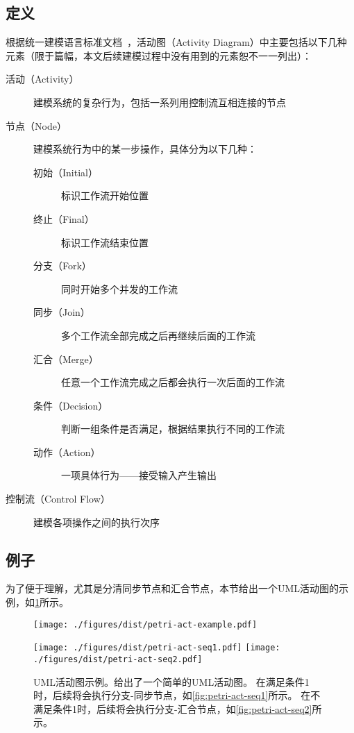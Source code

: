 \documentclass[index]{subfiles}
\begin{document}
\subsection{定义}
根据统一建模语言标准文档~，活动图（Activity Diagram）中主要包括以下几种元素（限于篇幅，本文后续建模过程中没有用到的元素恕不一一列出）：
\begin{description}
  \item[活动（Activity）] 建模系统的复杂行为，包括一系列用控制流互相连接的节点
  \item[节点（Node）] 建模系统行为中的某一步操作，具体分为以下几种：
  \begin{description}
    \item[初始（Initial）] 标识工作流开始位置
    \item[终止（Final）] 标识工作流结束位置
    \item[分支（Fork）] 同时开始多个并发的工作流
    \item[同步（Join）] 多个工作流全部完成之后再继续后面的工作流
    \item[汇合（Merge）] 任意一个工作流完成之后都会执行一次后面的工作流
    \item[条件（Decision）] 判断一组条件是否满足，根据结果执行不同的工作流
    \item[动作（Action）] 一项具体行为——接受输入产生输出
  \end{description}
  \item[控制流（Control Flow）] 建模各项操作之间的执行次序
\end{description}

\subsection{例子}
为了便于理解，尤其是分清同步节点和汇合节点，本节给出一个UML活动图的示例，如\cref{fig:petri-act}所示。
\begin{figure}[h]
  \centering%
    {\texttt{[image: ./figures/dist/petri-act-example.pdf]}}\par
    {\texttt{[image: ./figures/dist/petri-act-seq1.pdf]}}
  \hspace{10em}
    {\texttt{[image: ./figures/dist/petri-act-seq2.pdf]}}
  \caption[UML活动图示例]{UML活动图示例。给出了一个简单的UML活动图。
  在满足条件1时，后续将会执行分支-同步节点，如\cref{fig:petri-act-seq1}所示。
  在不满足条件1时，后续将会执行分支-汇合节点，如\cref{fig:petri-act-seq2}所示。\label{fig:petri-act}}
\end{figure}
\end{document}
